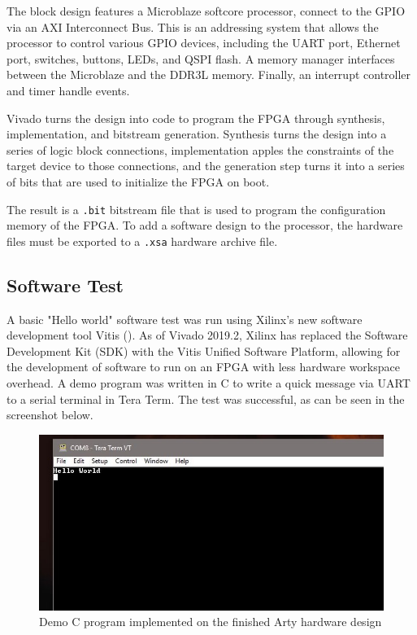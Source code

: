 \documentclass{article}
\begin{document}
The block design features a Microblaze softcore processor, connect to the GPIO via an AXI Interconnect Bus. This is an addressing system that allows the processor to control various GPIO devices, including the UART port, Ethernet port, switches, buttons, LEDs, and QSPI flash. A memory manager interfaces between the Microblaze and the DDR3L memory. Finally, an interrupt controller and timer handle events.\par
Vivado turns the design into code to program the FPGA through synthesis, implementation, and bitstream generation. Synthesis turns the design into a series of logic block connections, implementation apples the constraints of the target device to those connections, and the generation step turns it into a series of bits that are used to initialize the FPGA on boot.\par
The result is a \texttt{.bit} bitstream file that is used to program the configuration memory of the FPGA. To add a software design to the processor, the hardware files must be exported to a \texttt{.xsa} hardware archive file.

\subsection{Software Test}
A basic "Hello world" software test was run using Xilinx's new software development tool Vitis (\cite{vitis}). As of Vivado 2019.2, Xilinx has replaced the Software Development Kit (SDK) with the Vitis Unified Software Platform, allowing for the development of software to run on an FPGA with less hardware workspace overhead. A demo program was written in C to write a quick message via UART to a serial terminal in Tera Term. The test was successful, as can be seen in the screenshot below.\par

\begin{figure}[!htb]
	\centering
	\includegraphics [width=\textwidth] {11-20-19_hello_world.JPG}
	\caption{Demo C program implemented on the finished Arty hardware design}
	\label{fig:block}
\end{figure}
\end{document}
